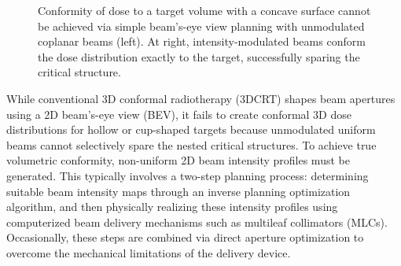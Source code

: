 \begin{figure}[H]
{
    }
    \caption{Conformity of dose to a target volume with a concave surface cannot be achieved via simple beam's-eye view planning with unmodulated coplanar beams (left). At right, intensity-modulated beams conform the dose distribution exactly to the target, successfully sparing the critical structure.}
    \label{fig:imrt_rationale}
\end{figure}
While conventional 3D conformal radiotherapy (3DCRT) shapes beam apertures using a 2D beam's-eye view (BEV), it fails to create conformal 3D dose distributions for hollow or cup-shaped targets because unmodulated uniform beams cannot selectively spare the nested critical structures. To achieve true volumetric conformity, non-uniform 2D beam intensity profiles must be generated. This typically involves a two-step planning process: determining suitable beam intensity maps through an inverse planning optimization algorithm, and then physically realizing these intensity profiles using computerized beam delivery mechanisms such as multileaf collimators (MLCs). Occasionally, these steps are combined via direct aperture optimization to overcome the mechanical limitations of the delivery device.


